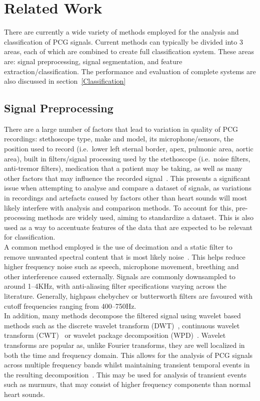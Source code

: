 \documentclass[titlepage, 12pt]{scrartcl} \usepackage{enumitem}
\begin{document}
\section{Related Work}
There are currently a wide variety of methods employed for the analysis and
classification of PCG signals. Current methods can typically be divided into 3
areas, each of which are combined to create full classification system. These
areas are: signal preprocessing, signal segmentation, and feature
extraction/classification. The performance and evaluation of complete systems
are also discussed in section~\ref{Classification}


\subsection{Signal Preprocessing}
There are a large number of factors that lead to variation in quality of PCG
recordings: stethoscope type, make and model, its microphone/sensors, the
position used to record (i.e.\ lower left sternal border, apex, pulmonic area,
aortic area), built in filters/signal processing used by the stethoscope (i.e.\
noise filters, anti-tremor filters), medication that a patient may be taking,
as well as many other factors that may influence the recorded
signal~\parencite[p.4]{Pavlopoulos2004}. This presents a significant issue when
attempting to analyse and compare a dataset of signals, as variations in
recordings and artefacts caused by factors other than heart sounds will most
likely interfere with analysis and comparison methods. To account for this,
pre-processing methods are widely used, aiming to standardize a dataset. This
is also used as a way to accentuate features of the data that are expected to
be relevant for classification.\\

A common method employed is the use of decimation and a static filter to remove
unwanted spectral content that is most likely noise~\parencite{Liang1997a,
Homsi2016, Springer2016, Gupta2007}. This helps reduce higher frequency noise
such as speech, microphone movement, breething and other interference caused
externally. Signals are commonly downsampled to around 1--4KHz, with
anti-aliasing filter specifications varying across the literature. Generally,
highpass chebychev or butterworth filters are favoured with cutoff frequencies
ranging from 400--750Hz.\\

In addition, many methods decompose the filtered signal using wavelet based
methods such as the discrete wavelet transform
(DWT)~\parencite{Liang1997a, Pavlopoulos2004}, continuous
wavelet transform (CWT)~\parencite{Langley2016} or wavelet
package decomposition (WPD)~\parencite{Liang1998}.
Wavelet transforms are popular as, unlike Fourier transforms, they are well
localized in both the time and frequency domain. This allows for the analysis
of PCG signals across multiple frequency bands whilst maintaining transient
temporal events in the resulting decomposition~\parencite[p.93]{Ari2008}.
This may be used for analysis of transient events such as murmurs, that may
consist of higher frequency components than normal heart sounds.
\end{document}
